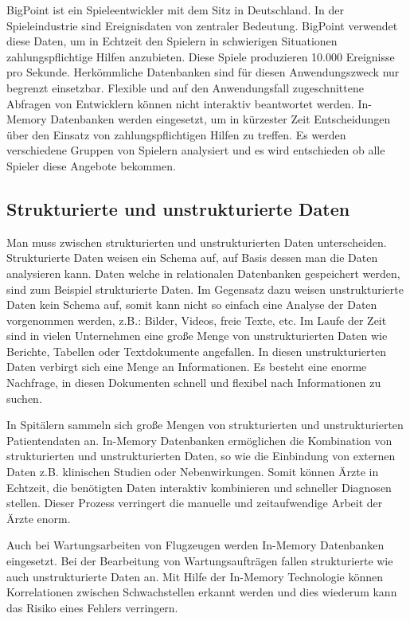 \documentclass[draft,final]{vutinfth} %
\begin{document}
BigPoint ist ein Spieleentwickler mit dem Sitz in Deutschland. In der Spieleindustrie sind Ereignisdaten von zentraler Bedeutung. BigPoint verwendet diese Daten, um in Echtzeit den Spielern in schwierigen Situationen zahlungspflichtige Hilfen anzubieten. Diese Spiele produzieren 10.000 Ereignisse pro Sekunde. Herkömmliche Datenbanken sind für diesen Anwendungszweck nur begrenzt einsetzbar. Flexible und auf den Anwendungsfall zugeschnittene Abfragen von Entwicklern können nicht interaktiv beantwortet werden. In-Memory Datenbanken werden eingesetzt, um in kürzester Zeit Entscheidungen über den Einsatz von zahlungspflichtigen Hilfen zu treffen. Es werden verschiedene Gruppen von Spielern analysiert und es wird entschieden ob alle Spieler diese Angebote bekommen.

\subsection*{Strukturierte und unstrukturierte Daten}
Man muss zwischen strukturierten und unstrukturierten Daten unterscheiden. Strukturierte Daten weisen ein Schema auf, auf Basis dessen man die Daten analysieren kann. Daten welche in relationalen Datenbanken gespeichert werden, sind zum Beispiel strukturierte Daten. Im Gegensatz dazu weisen unstrukturierte Daten kein Schema auf, somit kann nicht so einfach eine Analyse der Daten vorgenommen werden, z.B.: Bilder, Videos, freie Texte, etc. Im Laufe der Zeit sind in vielen Unternehmen eine gro\ss e Menge von unstrukturierten Daten wie Berichte, Tabellen oder Textdokumente angefallen. In diesen unstrukturierten Daten verbirgt sich eine Menge an Informationen. Es besteht eine enorme Nachfrage, in diesen Dokumenten schnell und flexibel nach Informationen zu suchen.

In Spitälern sammeln sich gro\ss e Mengen von strukturierten und unstrukturierten Patientendaten an. In-Memory Datenbanken ermöglichen die Kombination von strukturierten und unstrukturierten Daten, so wie die Einbindung von externen Daten z.B. klinischen Studien oder Nebenwirkungen. Somit können Ärzte in Echtzeit, die benötigten Daten interaktiv kombinieren und schneller Diagnosen stellen. Dieser Prozess verringert die manuelle und zeitaufwendige Arbeit der Ärzte enorm.

Auch bei Wartungsarbeiten von Flugzeugen werden In-Memory Datenbanken eingesetzt. Bei der Bearbeitung von Wartungsaufträgen fallen strukturierte wie auch unstrukturierte Daten an. Mit Hilfe der In-Memory Technologie können Korrelationen zwischen Schwachstellen erkannt werden und dies wiederum kann das Risiko eines Fehlers verringern.
\end{document}
